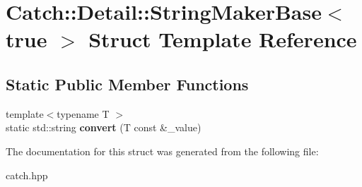 \hypertarget{structCatch_1_1Detail_1_1StringMakerBase_3_01true_01_4}{}\section{Catch\+:\+:Detail\+:\+:String\+Maker\+Base$<$ true $>$ Struct Template Reference}
\label{structCatch_1_1Detail_1_1StringMakerBase_3_01true_01_4}
\subsection*{Static Public Member Functions}
\begin{DoxyCompactItemize}
\item 
{\footnotesize template$<$typename T $>$ }\\static std\+::string {\bfseries convert} (T const \&\+\_\+value)\hypertarget{structCatch_1_1Detail_1_1StringMakerBase_3_01true_01_4_af9b5fdf7fddd8c5c873caa819e5f00f6}{}\label{structCatch_1_1Detail_1_1StringMakerBase_3_01true_01_4_af9b5fdf7fddd8c5c873caa819e5f00f6}

\end{DoxyCompactItemize}


The documentation for this struct was generated from the following file\+:\begin{DoxyCompactItemize}
\item 
catch.\+hpp\end{DoxyCompactItemize}
